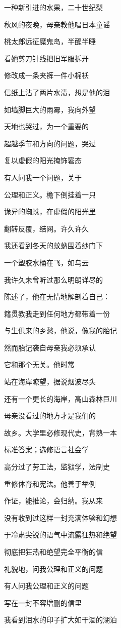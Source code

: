 一种新引进的水果，二十世纪梨

秋风的夜晚，母亲教他唱日本童谣

桃太郎远征魔鬼岛，半醒半睡

看她剪刀针线把旧军服拆开

修改成一条夹裤一件小棉袄

信纸上沾了两片水渍，想是他的泪

如墙脚巨大的雨霉，我向外望

天地也哭过，为一个重要的

超越季节和方向的问题，哭过

复以虚假的阳光掩饰窘态



有人问我一个问题，关于

公理和正义。檐下倒挂着一只

诡异的蜘蛛，在虚假的阳光里

翻转反覆，结网。许久许久

我还看到冬天的蚊蚋围着纱门下

一个塑胶水桶在飞，如乌云

我许久未曾听过那么明朗详尽的

陈述了，他在无情地解剖着自己：

籍贯教我走到任何地方都带着一份

与生俱来的乡愁，他说，像我的胎记

然而胎记袭自母亲我必须承认

它和那个无关。他时常

站在海岸瞭望，据说烟波尽头

还有一个更长的海岸，高山森林巨川

母亲没看过的地方才是我们的

故乡。大学里必修现代史，背熟一本

标准答案；选修语言社会学

高分过了劳工法，监狱学，法制史

重修体育和宪法。他善于举例

作证，能推论，会归纳。我从来

没有收到过这样一封充满体验和幻想

于冷肃尖锐的语气中流露狂热和绝望

彻底把狂热和绝望完全平衡的信

礼貌地，问我公理和正义的问题



有人问我公理和正义的问题

写在一封不容增删的信里

我看到泪水的印子扩大如干涸的湖泊

